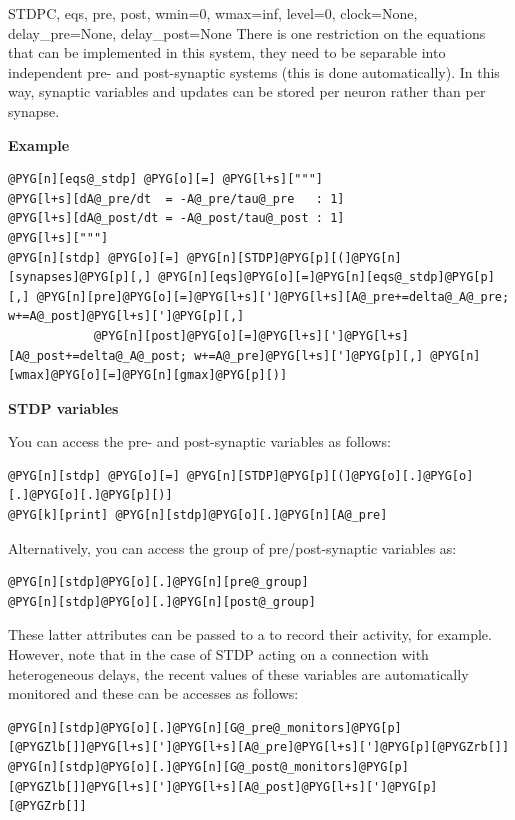 \documentclass[letterpaper,10pt,english]{manual}
\begin{document}
\begin{classdesc}{STDP}{C, eqs, pre, post, wmin=0, wmax=inf, level=0, clock=None, delay\_pre=None, delay\_post=None}
There is one restriction on the equations that can be implemented in this
system, they need to be separable into independent pre- and post-synaptic
systems (this is done automatically). In this way, synaptic variables and
updates can be stored per neuron rather than per synapse.

\textbf{Example}

\begin{Verbatim}[commandchars=@\[\]]
@PYG[n][eqs@_stdp] @PYG[o][=] @PYG[l+s]["""]
@PYG[l+s][dA@_pre/dt  = -A@_pre/tau@_pre   : 1]
@PYG[l+s][dA@_post/dt = -A@_post/tau@_post : 1]
@PYG[l+s]["""]
@PYG[n][stdp] @PYG[o][=] @PYG[n][STDP]@PYG[p][(]@PYG[n][synapses]@PYG[p][,] @PYG[n][eqs]@PYG[o][=]@PYG[n][eqs@_stdp]@PYG[p][,] @PYG[n][pre]@PYG[o][=]@PYG[l+s][']@PYG[l+s][A@_pre+=delta@_A@_pre; w+=A@_post]@PYG[l+s][']@PYG[p][,]
            @PYG[n][post]@PYG[o][=]@PYG[l+s][']@PYG[l+s][A@_post+=delta@_A@_post; w+=A@_pre]@PYG[l+s][']@PYG[p][,] @PYG[n][wmax]@PYG[o][=]@PYG[n][gmax]@PYG[p][)]
\end{Verbatim}

\textbf{STDP variables}

You can access the pre- and post-synaptic variables as follows:

\begin{Verbatim}[commandchars=@\[\]]
@PYG[n][stdp] @PYG[o][=] @PYG[n][STDP]@PYG[p][(]@PYG[o][.]@PYG[o][.]@PYG[o][.]@PYG[p][)]
@PYG[k][print] @PYG[n][stdp]@PYG[o][.]@PYG[n][A@_pre]
\end{Verbatim}

Alternatively, you can access the group of pre/post-synaptic variables
as:

\begin{Verbatim}[commandchars=@\[\]]
@PYG[n][stdp]@PYG[o][.]@PYG[n][pre@_group]
@PYG[n][stdp]@PYG[o][.]@PYG[n][post@_group]
\end{Verbatim}

These latter attributes can be passed to a \hyperlink{brian.StateMonitor}{} to
record their activity, for example. However, note that in the case of
STDP acting on a connection with heterogeneous delays, the recent values
of these variables are automatically monitored and these can be
accesses as follows:

\begin{Verbatim}[commandchars=@\[\]]
@PYG[n][stdp]@PYG[o][.]@PYG[n][G@_pre@_monitors]@PYG[p][@PYGZlb[]]@PYG[l+s][']@PYG[l+s][A@_pre]@PYG[l+s][']@PYG[p][@PYGZrb[]]
@PYG[n][stdp]@PYG[o][.]@PYG[n][G@_post@_monitors]@PYG[p][@PYGZlb[]]@PYG[l+s][']@PYG[l+s][A@_post]@PYG[l+s][']@PYG[p][@PYGZrb[]]
\end{Verbatim}


\end{classdesc}
\end{document}
